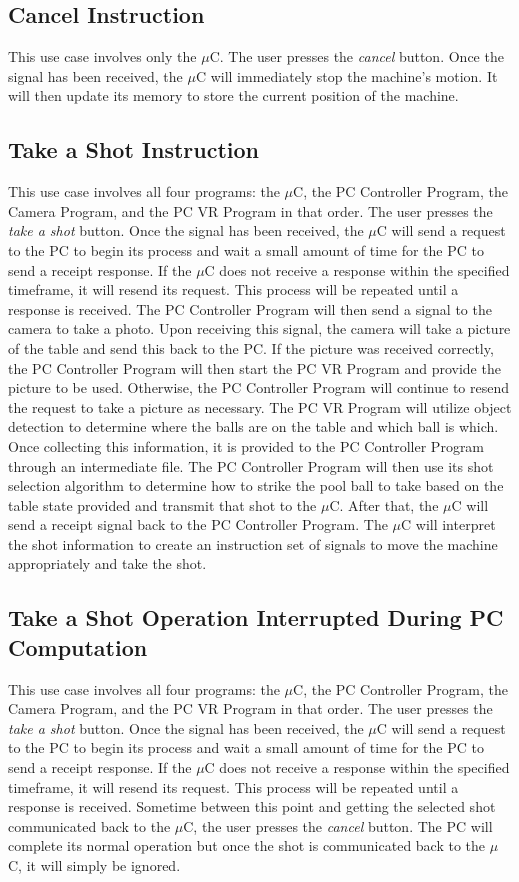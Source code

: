 \documentclass[titlepage]{article}
\begin{document}
\subsection{Cancel Instruction}
This use case involves only the $\mu$C. The user presses the \textit{cancel} button. Once the signal has been received, the $\mu$C will immediately stop the machine's motion. It will then update its memory to store the current position of the machine.
\subsection{Take a Shot Instruction}
This use case involves all four programs: the $\mu$C, the PC Controller Program, the Camera Program, and the PC VR Program in that order. The user presses the \textit{take a shot} button. Once the signal has been received, the $\mu$C will send a request to the PC to begin its process and wait a small amount of time for the PC to send a receipt response. If the $\mu$C does not receive a response within the specified timeframe, it will resend its request. This process will be repeated until a response is received. The PC Controller Program will then send a signal to the camera to take a photo. Upon receiving this signal, the camera will take a picture of the table and send this back to the PC. If the picture was received correctly, the PC Controller Program will then start the PC VR Program and provide the picture to be used. Otherwise, the PC Controller Program will continue to resend the request to take a picture as necessary. The PC VR Program will utilize object detection to determine where the balls are on the table and which ball is which. Once collecting this information, it is provided to the PC Controller Program through an intermediate file. The PC Controller Program will then use its shot selection algorithm to determine how to strike the pool ball to take based on the table state provided and transmit that shot to the $\mu$C. After that, the $\mu$C will send a receipt signal back to the PC Controller Program. The $\mu$C will interpret the shot information to create an instruction set of signals to move the machine appropriately and take the shot.
\subsection{Take a Shot Operation Interrupted During PC Computation}
This use case involves all four programs: the $\mu$C, the PC Controller Program, the Camera Program, and the PC VR Program in that order. The user presses the \textit{take a shot} button. Once the signal has been received, the $\mu$C will send a request to the PC to begin its process and wait a small amount of time for the PC to send a receipt response. If the $\mu$C does not receive a response within the specified timeframe, it will resend its request. This process will be repeated until a response is received. Sometime between this point and getting the selected shot communicated back to the $\mu$C, the user presses the \textit{cancel} button. The PC will complete its normal operation but once the shot is communicated back to the $\mu$C, it will simply be ignored.
\end{document}
